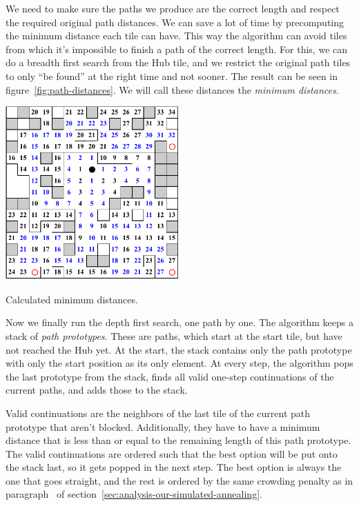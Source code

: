 We need to make sure the paths we produce are the correct length and respect the required original path distances.
We can save a lot of time by precomputing the minimum distance each tile can have.
This way the algorithm can avoid tiles from which it's impossible to finish a path of the correct length.
For this, we can do a breadth first search from the Hub tile, and we restrict the original path tiles to only \enquote{be found} at the right time and not sooner.
The result can be seen in figure~\ref{fig:path-distances}.
We will call these distances the \emph{minimum distances}.

\begin{center}
    \captionsetup{type=figure}
    \includegraphics[width=0.5\textwidth]{img/Path Distances.pdf}
    \caption{Calculated minimum distances.}
    \label{fig:path-distances}
\end{center}

Now we finally run the depth first search, one path by one.
The algorithm keeps a stack of \emph{path prototypes}.
These are paths, which start at the start tile, but have not reached the Hub yet.
At the start, the stack contains only the path prototype with only the start position as its only element.
At every step, the algorithm pops the last prototype from the stack, finds all valid one-step continuations of the current paths, and adds those to the stack.

Valid continuations are the neighbors of the last tile of the current path prototype that aren't blocked.
Additionally, they have to have a minimum distance that is less than or equal to the remaining length of this path prototype.
The valid continuations are ordered such that the best option will be put onto the stack last, so it gets popped in the next step.
The best option is always the one that goes straight, and the rest is ordered by the same crowding penalty as in paragraph~ of section~\ref{sec:analysis-our-simulated-annealing}.

